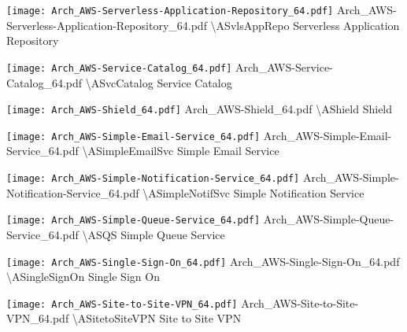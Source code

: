  {\texttt{[image: Arch\_AWS-Serverless-Application-Repository\_64.pdf]}} {Arch\_AWS-Serverless-Application-Repository\_64.pdf} {{\textbackslash}ASvlsAppRepo} {Serverless Application Repository}

 {\texttt{[image: Arch\_AWS-Service-Catalog\_64.pdf]}} {Arch\_AWS-Service-Catalog\_64.pdf} {{\textbackslash}ASvcCatalog} {Service Catalog}

 {\texttt{[image: Arch\_AWS-Shield\_64.pdf]}} {Arch\_AWS-Shield\_64.pdf} {{\textbackslash}AShield} {Shield}

 {\texttt{[image: Arch\_AWS-Simple-Email-Service\_64.pdf]}} {Arch\_AWS-Simple-Email-Service\_64.pdf} {{\textbackslash}ASimpleEmailSvc} {Simple Email Service}

 {\texttt{[image: Arch\_AWS-Simple-Notification-Service\_64.pdf]}} {Arch\_AWS-Simple-Notification-Service\_64.pdf} {{\textbackslash}ASimpleNotifSvc} {Simple Notification Service}

 {\texttt{[image: Arch\_AWS-Simple-Queue-Service\_64.pdf]}} {Arch\_AWS-Simple-Queue-Service\_64.pdf} {{\textbackslash}ASQS} {Simple Queue Service}

 {\texttt{[image: Arch\_AWS-Single-Sign-On\_64.pdf]}} {Arch\_AWS-Single-Sign-On\_64.pdf} {{\textbackslash}ASingleSignOn} {Single Sign On}

 {\texttt{[image: Arch\_AWS-Site-to-Site-VPN\_64.pdf]}} {Arch\_AWS-Site-to-Site-VPN\_64.pdf} {{\textbackslash}ASitetoSiteVPN} {Site to Site VPN}

